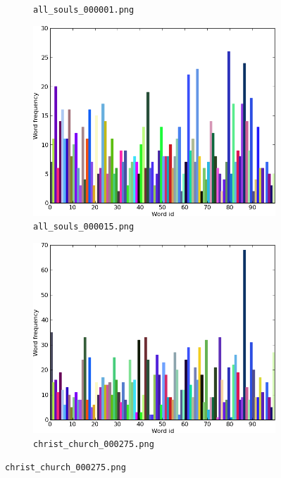 \documentclass[a4paper,10pt,twoside]{article}
\begin{document}
\begin{figure}
\begin{subfigure}{0.49\textwidth}
    \caption{\texttt{all\_souls\_000001.png}}
  \end{subfigure}
  \begin{subfigure}{0.49\textwidth}
    \centering
    \includegraphics[width=\textwidth,height=.3\textheight,keepaspectratio]{histogram3}
    \caption{\texttt{all\_souls\_000015.png}}
  \end{subfigure}
  \begin{subfigure}{0.49\textwidth}
    \centering
    \includegraphics[width=\textwidth,height=.3\textheight,keepaspectratio]{histogram4}
    \caption{\texttt{christ\_church\_000275.png}}
  \end{subfigure}

\end{figure}
\end{document}
